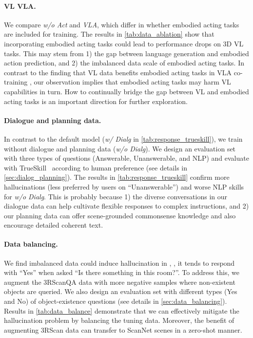 \documentclass{article}
\begin{document}
\paragraph{VL \vs VLA.} We compare \textit{w/o Act} and \textit{VLA}, which differ in whether embodied acting tasks are included for training. The results in \cref{tab:data_ablation} show that incorporating embodied acting tasks could lead to performance drops on 3D VL tasks. This may stem from 1) the gap between language generation and embodied action prediction, and 2) the imbalanced data scale of embodied acting tasks. In contrast to the finding that VL data benefits embodied acting tasks in VLA co-training \citep{brohan2023rt}, our observation implies that embodied acting tasks may harm VL capabilities in turn. How to continually bridge the gap between VL and embodied acting tasks is an important direction for further exploration.


\paragraph{Dialogue and planning data.} In contrast to the default model (\textit{w/ Dialg} in \cref{tab:response_trueskill}), we train \agent without dialogue and planning data (\textit{w/o Dialg}). We design an evaluation set with three types of questions (Answerable, Unanswerable, and NLP) and evaluate with TrueSkill~\citep{graepel2007bayesian} according to human preference (see details in \cref{sec:dialog_planning}). The results in \cref{tab:response_trueskill} confirm more hallucinations (less preferred by users on ``Unanswerable'') and worse NLP skills for \textit{w/o Dialg}. This is probably because 1) the diverse conversations in our dialogue data can help cultivate flexible responses to complex instructions, and 2) our planning data can offer scene-grounded commonsense knowledge and also encourage detailed coherent text.



\paragraph{Data balancing.} We find imbalanced data could induce hallucination in \agent, \eg, it tends to respond with ``Yes'' when asked ``Is there something in this room?''. To address this, we augment the 3RScanQA data with more negative samples where non-existent objects are queried. We also design an evaluation set with different types (Yes and No) of object-existence questions (see details in \cref{sec:data_balancing}). Results in \cref{tab:data_balance} demonstrate that we can effectively mitigate the hallucination problem by balancing the tuning data. Moreover, the benefit of augmenting 3RScan data can transfer to ScanNet scenes in a zero-shot manner.
\end{document}
